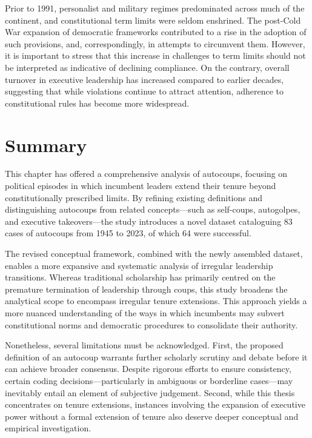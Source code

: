 \documentclass[
  12pt,
]{report}
\begin{document}
Prior to 1991, personalist and military regimes predominated across much
of the continent, and constitutional term limits were seldom enshrined.
The post-Cold War expansion of democratic frameworks contributed to a
rise in the adoption of such provisions, and, correspondingly, in
attempts to circumvent them. However, it is important to stress that
this increase in challenges to term limits should not be interpreted as
indicative of declining compliance. On the contrary, overall turnover in
executive leadership has increased compared to earlier decades,
suggesting that while violations continue to attract attention,
adherence to constitutional rules has become more widespread.

\section{Summary}\label{summary}

This chapter has offered a comprehensive analysis of autocoups, focusing
on political episodes in which incumbent leaders extend their tenure
beyond constitutionally prescribed limits. By refining existing
definitions and distinguishing autocoups from related concepts---such as
self-coups, autogolpes, and executive takeovers---the study introduces a
novel dataset cataloguing 83 cases of autocoups from 1945 to 2023, of
which 64 were successful.

The revised conceptual framework, combined with the newly assembled
dataset, enables a more expansive and systematic analysis of irregular
leadership transitions. Whereas traditional scholarship has primarily
centred on the premature termination of leadership through coups, this
study broadens the analytical scope to encompass irregular tenure
extensions. This approach yields a more nuanced understanding of the
ways in which incumbents may subvert constitutional norms and democratic
procedures to consolidate their authority.

Nonetheless, several limitations must be acknowledged. First, the
proposed definition of an autocoup warrants further scholarly scrutiny
and debate before it can achieve broader consensus. Despite rigorous
efforts to ensure consistency, certain coding decisions---particularly
in ambiguous or borderline cases---may inevitably entail an element of
subjective judgement. Second, while this thesis concentrates on tenure
extensions, instances involving the expansion of executive power without
a formal extension of tenure also deserve deeper conceptual and
empirical investigation.
\end{document}
